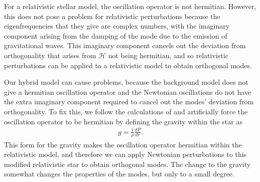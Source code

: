 \documentclass[fleqn,usenatbib]{mnras}
\begin{document}
\hspace{\parindent}For a relativistic stellar model, the oscillation operator is not hermitian. However, this does not pose a problem for relativistic perturbations because the eigenfrequencies that they give are complex numbers, with the imaginary component arising from the damping of the mode due to the emission of gravitational waves. This imaginary component cancels out the deviation from orthogonality that arises from $\mathcal{H}$ not being hermitian, and so relativistic perturbations can be applied to a relativistic model to obtain orthogonal modes.

\hspace{\parindent} Our hybrid model can cause problems, because the background model does not give a hermitian oscillation operator and the Newtonian oscillations do not have the extra imaginary component required to cancel out the modes' deviation from orthogonality. To fix this, we follow the calculations of \citet{reisenegger1994multipole} and artificially force the oscillation operator to be hermitian by defining the gravity within the star as
\begin{align}
g=\frac{1}{\rho}\frac{dP}{dr}.
\label{eq:rel_grav}
\end{align}
\noindent This form for the gravity makes the oscillation operator hermitian within the relativistic model, and therefore we can apply Newtonian perturbations to this modified relativistic star to obtain orthogonal modes. The change to the gravity somewhat changes the properties of the modes, but only to a small degree.













\iffalse
\end{document}
